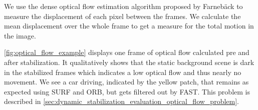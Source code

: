 We use the dense optical flow estimation algorithm proposed by Farnebäck \cite{farnback10.1007/3-540-45103-X_50,opencv_library} to measure the displacement of each pixel between the frames. 
We calculate the mean displacement over the whole frame to get a measure for the total motion in the image. 

\autoref{fig:optical_flow_example} displays one frame of optical flow calculated pre and after stabilization.
It qualitatively shows that the static background scene is dark in the stabilized frames which indicates a low optical flow and thus nearly no movement. 
We see a car driving, indicated by the yellow patch, that remains as expected using SURF and ORB, but gets filtered out by FAST. This problem is described in \autoref{sec:dynamic_stabilization_evaluation_optical_flow_problem}.     

